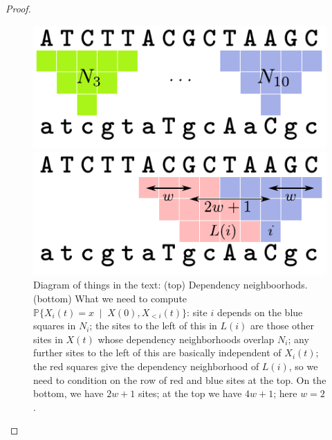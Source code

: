 \documentclass{article}
\renewcommand{\P}{\mathbb{P}}
\newcommand{\given}{\;\mid\;}
\theoremstyle{plain}
\theoremstyle{definition}
\begin{document}
\begin{proof}
\begin{figure}
    \begin{center}
        \includegraphics{context-neighborhoods-defns}

        \vspace{2em}

        \includegraphics{context-neighborhoods-widths}
    \end{center}
    \caption{
        Diagram of things in the text:
        (top) Dependency neighboorhods.
        (bottom) What we need to compute $\P\{X_i(t)=x \given X(0), X_{<i}(t)\}$:
        site $i$ depends on the blue squares in $N_i$;
        the sites to the left of this in $L(i)$ are those other sites in $X(t)$
        whose dependency neighborhoods overlap $N_i$;
        any further sites to the left of this are basically independent of $X_i(t)$;
        the red squares give the dependency neighborhood of $L(i)$,
        so we need to condition on the row of red and blue sites at the top.
        On the bottom, we have $2w+1$ sites; at the top we have $4w+1$;
        here $w=2$.
        \label{fig:neighborhoods}
    }
\end{figure}



\end{proof}
\end{document}
